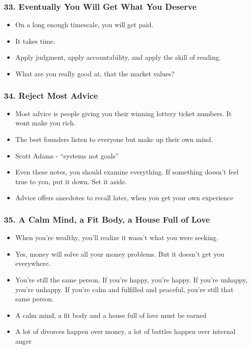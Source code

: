\begin{frame}[fragile]
\frametitle{33. Eventually You Will Get What You Deserve}
\begin{itemize}
\item On a long enough timescale, you will get paid.
\item It takes time.
\item  Apply judgment, apply accountability, and apply the skill of reading.
\item What are you really good at, that the market values?
\end{itemize}
\end{frame}

\begin{frame}[fragile]
\frametitle{34. Reject Most Advice}
\begin{itemize}
\item Most advice is people giving you their winning lottery ticket numbers. It wont make you rich.
\item The best founders listen to everyone but make up their own mind.
\item Scott Adams - ``systems not goals''
\item Even these notes,  you should examine everything. If something doesn't feel true to you, put it down.
Set it aside.
\item Advice offers anecdotes to recall later, when you get your own experience
\end{itemize}
\end{frame}

\begin{frame}[fragile]
\frametitle{35. A Calm Mind, a Fit Body, a House Full of Love}
\begin{itemize}
\item When you're wealthy, you'll realize it wasn't what you were seeking.
\item Yes, money will solve all your money problems. But it doesn't get you everywhere. 
\item You're still the same person.  If
you're happy, you're happy. If you're unhappy, you're unhappy. If you're calm and fulfilled and peaceful,
you're still that same person.
\item A calm mind, a  fit body and a house full of love must be earned
\item A lot of divorces happen over money, a lot of battles happen over internal anger
\end{itemize}
\end{frame}


